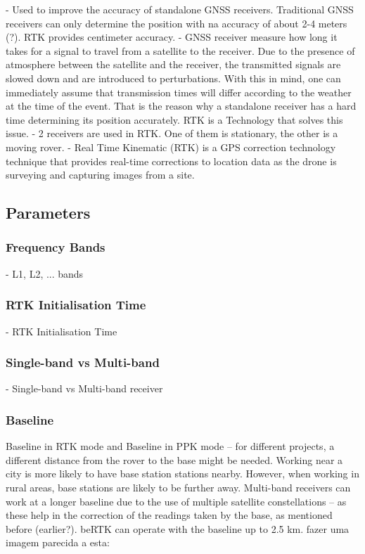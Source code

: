 - Used to improve the accuracy of standalone GNSS receivers. Traditional GNSS receivers can only determine the position with na accuracy of about 2-4 meters (?). RTK provides centimeter accuracy.
- GNSS receiver measure how long it takes for a signal to travel from a satellite to the receiver. Due to the presence of atmosphere between the satellite and the receiver, the transmitted signals are slowed down and are introduced to perturbations. With this in mind, one can immediately assume that transmission times will differ according to the weather at the time of the event. That is the reason why a standalone receiver has a hard time determining its position accurately. RTK is a Technology that solves this issue.
- 2 receivers are used in RTK. One of them is stationary, the other is a moving rover.
- Real Time Kinematic (RTK) is a GPS correction technology technique that provides real-time corrections to location data as the drone is surveying and capturing images from a site.

\subsection{Parameters}\label{sec:II_rtk_parameters}

\subsubsection{Frequency Bands}\label{sec:II_rtk_parameters_freq_bands}
- L1, L2, ... bands

\subsubsection{RTK Initialisation Time}\label{sec:II_rtk_parameters_init_time}

- RTK Initialisation Time

\subsubsection{Single-band vs Multi-band}\label{sec:II_rtk_parameters_s_m_band}

- Single-band vs Multi-band receiver

\subsubsection{Baseline}\label{sec:II_rtk_parameters_baseline}

Baseline in RTK mode and Baseline in PPK mode -- for different projects, a different distance from the rover to the base might be needed. Working near a city is more likely to have base station stations nearby. However, when working in rural areas, base stations are likely to be further away.
Multi-band receivers can work at a longer baseline due to the use of multiple satellite constellations -- as these help in the correction of the readings taken by the base, as mentioned before (earlier?). beRTK can operate with the baseline up to 2.5 km.
fazer uma imagem parecida a esta:

